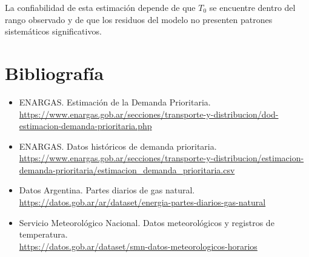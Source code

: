 \documentclass[12pt,a4paper]{article}
\begin{document}
La confiabilidad de esta estimación depende de que \(T_0\) se encuentre dentro del rango observado y de que los residuos del modelo no presenten patrones sistemáticos significativos.

\section{Bibliografía}

\begin{itemize}
    \item ENARGAS. Estimación de la Demanda Prioritaria.\\
    \url{https://www.enargas.gob.ar/secciones/transporte-y-distribucion/dod-estimacion-demanda-prioritaria.php}

    \item ENARGAS. Datos históricos de demanda prioritaria.\\
    \url{https://www.enargas.gob.ar/secciones/transporte-y-distribucion/estimacion-demanda-prioritaria/estimacion_demanda_prioritaria.csv}

    \item Datos Argentina. Partes diarios de gas natural.\\
    \url{https://datos.gob.ar/ar/dataset/energia-partes-diarios-gas-natural}

    \item Servicio Meteorológico Nacional. Datos meteorológicos y registros de temperatura.\\
    \url{https://datos.gob.ar/dataset/smn-datos-meteorologicos-horarios}
\end{itemize}
\end{document}
